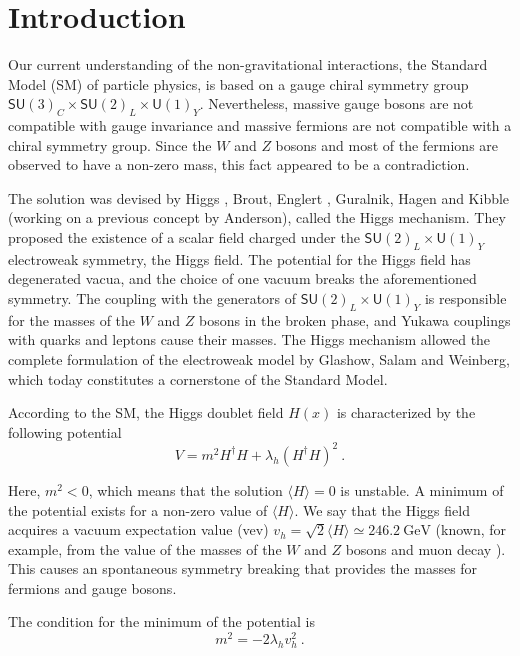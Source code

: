 \documentclass[aps,prd,preprintnumbers,nofootinbibn,twocolumn]{revtex4}
\begin{document}
\section{Introduction}
Our current understanding of the non-gravitational interactions, the Standard Model (SM) of particle physics, is based on a gauge chiral symmetry group $\mathsf{SU}(3)_C \times \mathsf{SU}(2)_L \times \mathsf{U}(1)_Y $. Nevertheless, massive gauge bosons are not compatible with gauge invariance and massive fermions are not compatible with a chiral symmetry group. Since the $W$ and $Z$ bosons and most of the fermions are observed to have a non-zero mass, this fact appeared to be a contradiction.

The solution was devised by Higgs \cite{Higgs:1964pj}, Brout, Englert \cite{Englert:1964et}, Guralnik, Hagen and Kibble \cite{Guralnik:1964eu} (working on a previous concept by Anderson), called the Higgs mechanism. They proposed the existence of a scalar field charged under the $\mathsf{SU}(2)_L \times \mathsf{U}(1)_Y$ electroweak symmetry, the Higgs field. The potential for the Higgs field has degenerated vacua, and the choice of one vacuum breaks the
aforementioned symmetry. The coupling with the generators of $\mathsf{SU}(2)_L \times \mathsf{U}(1)_Y$ is responsible for the masses of the $W$ and $Z$ bosons in the broken phase, and Yukawa couplings with quarks and leptons cause their masses. The Higgs mechanism allowed the complete formulation of the electroweak model by Glashow, Salam and Weinberg, which today constitutes a cornerstone of the Standard Model.


According to the SM, the Higgs doublet field $H(x)$ is characterized by the following potential
\begin{equation}\label{eq:HiggsPotential}
V = m^2 H^\dagger H + \lambda_h (H^\dagger H)^2\ .
\end{equation}

Here, $m^2 < 0$, which means that the solution $\langle H\rangle=0$ is unstable. A minimum of the potential exists for a non-zero value of $\langle H\rangle$. We say that the Higgs field acquires a vacuum expectation value (vev) $v_h = \sqrt{2}\langle H\rangle \simeq\SI{246.2}{\giga\electronvolt}$ (known, for example, from the value of the masses of the $W$ and $Z$ bosons and muon decay \cite{Agashe:2014kda}). This causes an spontaneous symmetry breaking that provides the masses for fermions and gauge bosons.

The condition for the minimum of the potential is
\begin{equation}
m^2 = -2\lambda_h v_h^2\ .
\end{equation}
\end{document}
